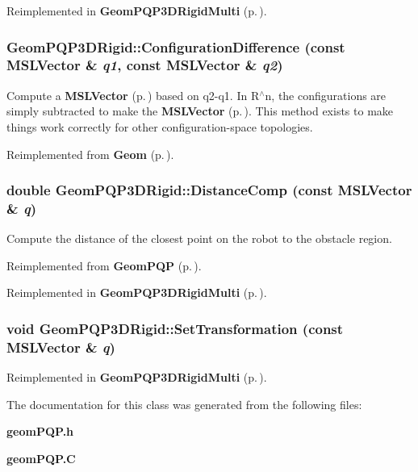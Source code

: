 Reimplemented in {\bf Geom\-PQP3DRigid\-Multi} {\rm (p.\,\pageref{classGeomPQP3DRigidMulti_a2})}.
\subsubsection{ Geom\-PQP3DRigid::Configuration\-Difference (const {\bf MSLVector} \& {\em q1}, const {\bf MSLVector} \& {\em q2})\hspace{0.3cm}{\tt  [virtual]}}\label{classGeomPQP3DRigid_a4}


Compute a {\bf MSLVector} {\rm (p.\,\pageref{classMSLVector})} based on q2-q1. In R$^\wedge$n, the configurations are simply subtracted to make the {\bf MSLVector} {\rm (p.\,\pageref{classMSLVector})}. This method exists to make things work correctly for other configuration-space topologies.



Reimplemented from {\bf Geom} {\rm (p.\,\pageref{classGeom_a4})}.
\subsubsection{\setlength{\rightskip}{0pt plus 5cm}double Geom\-PQP3DRigid::Distance\-Comp (const {\bf MSLVector} \& {\em q})\hspace{0.3cm}{\tt  [virtual]}}\label{classGeomPQP3DRigid_a3}


Compute the distance of the closest point on the robot to the obstacle region.



Reimplemented from {\bf Geom\-PQP} {\rm (p.\,\pageref{classGeomPQP_a5})}.

Reimplemented in {\bf Geom\-PQP3DRigid\-Multi} {\rm (p.\,\pageref{classGeomPQP3DRigidMulti_a3})}.
\subsubsection{\setlength{\rightskip}{0pt plus 5cm}void Geom\-PQP3DRigid::Set\-Transformation (const {\bf MSLVector} \& {\em q})}\label{classGeomPQP3DRigid_a5}




Reimplemented in {\bf Geom\-PQP3DRigid\-Multi} {\rm (p.\,\pageref{classGeomPQP3DRigidMulti_a5})}.

The documentation for this class was generated from the following files:\begin{CompactItemize}
\item 
{\bf geom\-PQP.h}\item 
{\bf geom\-PQP.C}\end{CompactItemize}
